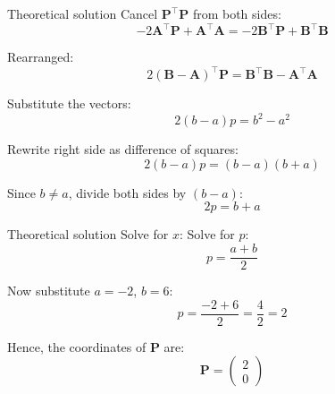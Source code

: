 \documentclass{beamer}
\begin{document}
\begin{frame}{Theoretical solution}
Cancel \(\mathbf{P}^\top \mathbf{P}\) from both sides:
\begin{equation}
- 2 \mathbf{A}^\top \mathbf{P} + \mathbf{A}^\top \mathbf{A} = - 2 \mathbf{B}^\top \mathbf{P} + \mathbf{B}^\top \mathbf{B}
\end{equation}

Rearranged:
\begin{equation}
2 (\mathbf{B} - \mathbf{A})^\top \mathbf{P} = \mathbf{B}^\top \mathbf{B} - \mathbf{A}^\top \mathbf{A}
\end{equation}

Substitute the vectors:
\begin{equation}
2 (b - a) p = b^2 - a^2
\end{equation}

Rewrite right side as difference of squares:
\begin{equation}
2 (b - a) p = (b - a)(b + a)
\end{equation}

Since \(b \neq a\), divide both sides by \((b - a)\):
\begin{equation}
2 p = b + a
\end{equation}
\end{frame}

\begin{frame}{Theoretical solution}
Solve for \(x\):
Solve for \(p\):
\begin{equation}
p = \frac{a + b}{2}
\end{equation}

Now substitute \(a = -2\), \(b = 6\):
\begin{equation}
p = \frac{-2 + 6}{2} = \frac{4}{2} = 2
\end{equation}

Hence, the coordinates of \(\mathbf{P}\) are:
\begin{equation}
\boxed{
\mathbf{P} = \begin{pmatrix} 2 \\ 0 \end{pmatrix}
}
\end{equation}
\end{frame}
\end{document}
